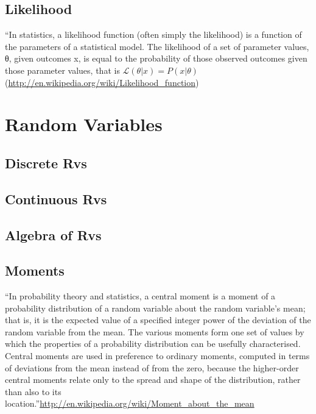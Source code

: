 \documentclass[reqno,12pt]{tufte-book}
\numberwithin{equation}{subsection}
\begin{document}
\section{Likelihood}

``In statistics, a likelihood function (often simply the likelihood)
is a function of the parameters of a statistical model. The likelihood
of a set of parameter values, θ, given outcomes x, is equal to the
probability of those observed outcomes given those parameter values,
that is $\mathcal{L}(\theta |x) = P(x | \theta)$
(\url{http://en.wikipedia.org/wiki/Likelihood_function})

\chapter{Random Variables}

\section{Discrete Rvs}

\section{Continuous Rvs}

\section{Algebra of Rvs}

\section{Moments}

``In probability theory and statistics, a central moment is a moment of a probability distribution of a random variable about the random variable's mean; that is, it is the expected value of a specified integer power of the deviation of the random variable from the mean. The various moments form one set of values by which the properties of a probability distribution can be usefully characterised. Central moments are used in preference to ordinary moments, computed in terms of deviations from the mean instead of from the zero, because the higher-order central moments relate only to the spread and shape of the distribution, rather than also to its location.''\url{http://en.wikipedia.org/wiki/Moment_about_the_mean}
\end{document}
